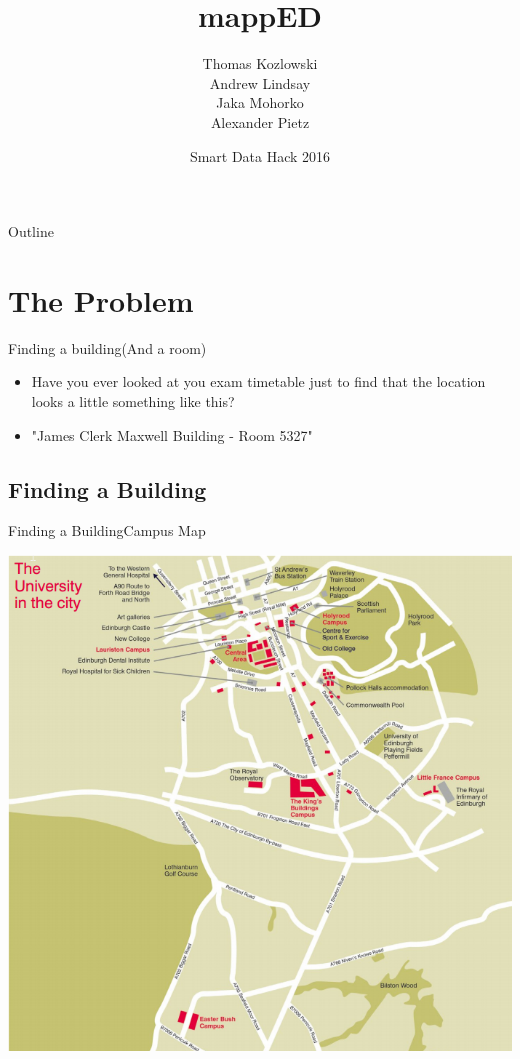 \documentclass{beamer}
\title{mappED}
\author{Thomas Kozlowski \\
Andrew Lindsay \\
Jaka Mohorko \\
Alexander Pietz}
\date{Smart Data Hack 2016}
\begin{document}
\begin{frame}
  \titlepage
\end{frame}

\begin{frame}{Outline}
  \tableofcontents
\end{frame}

\section{The Problem}


\begin{frame}{Finding a building}{(And a room)}
  \begin{itemize}
  \item {
    Have you ever looked at you exam timetable just to find that the location looks a little something like this?
  }\pause
  \item {
    "James Clerk Maxwell Building - Room 5327"
  }
  \end{itemize}
\end{frame}

\subsection{Finding a Building}
\begin{frame}{Finding a Building}{Campus Map}
  \centerline{\includegraphics[height=0.8\textheight]{campusmap.png}}
\end{frame}
\end{document}
